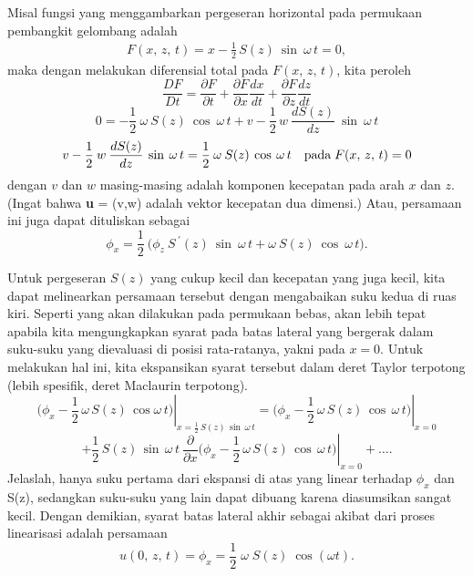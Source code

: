 \documentclass[12pt,a4paper]{report}
\begin{document}
Misal fungsi yang menggambarkan pergeseran horizontal pada permukaan
pembangkit gelombang adalah
\begin{eqnarray}
F(x,\,z,\,t) = x - \frac{1}{2}\,S(z)\:\sin \:\omega\, t = 0,
\end{eqnarray}
maka dengan melakukan diferensial total pada $F(x,\,z,\,t)$, kita peroleh
\begin{equation}
\frac{DF}{Dt} = \frac{\partial F}{\partial t} + \frac{\partial F}{\partial x}
\frac{dx}{dt} + \frac{\partial F}{\partial z} \frac{dz}{dt}
\end{equation}
\begin{equation}
0 = -\frac{1}{2}\:\omega\: S(z)\: \cos\: \omega\, t + v - \frac{1}{2}\,w\:
\frac{dS(z)}{dz}\: \sin\: \omega\, t
\end{equation}
\begin{equation}
v - \frac{1}{2}\:w\: \frac{dS(z)}{dz}\: \sin\: \omega\, t = \frac{1}{2}%
\:\omega\: S(z)\: \cos\: \omega\, t \quad \textmd{pada}
\;F(x,\,z,\,t)=0
\end{equation}
dengan $v$ dan $w$ masing-masing adalah komponen kecepatan pada arah $x$ dan
$z$. (Ingat bahwa \textbf{u} = (v,w) adalah vektor kecepatan dua dimensi.)
Atau, persamaan ini juga dapat dituliskan sebagai
\begin{equation}
\phi_{x}=\frac{1}{2}\:\Bigg(\phi_{z}\:S\,^{\prime}(z)\:\sin\: \omega\,
t+\omega\: S(z)\:\cos\: \omega\, t\Bigg).
\end{equation}

Untuk pergeseran $S(z)$ yang cukup kecil dan kecepatan yang juga
kecil, kita dapat melinearkan persamaan tersebut dengan
mengabaikan suku kedua di ruas kiri. Seperti yang akan dilakukan
pada permukaan bebas, akan lebih tepat apabila kita mengungkapkan
syarat pada batas lateral yang bergerak dalam suku-suku yang
dievaluasi di posisi rata-ratanya, yakni pada $x = 0.$ Untuk
melakukan hal ini, kita ekspansikan syarat tersebut dalam deret
Taylor terpotong (lebih spesifik, deret Maclaurin terpotong).
\[
\displaystyle\left.\Bigg(\phi_{x}-\frac{1}{2}\,\omega\,S(z)\,\cos \omega\,t%
\Bigg)\right|_{x=\frac{1}{2}\,S(z)\,\sin\,\omega\,t} =\left.\Bigg(\phi_{x}-%
\frac{1}{2}\,\omega\,S(z)\,\cos\,\omega\, t\Bigg)\right|_{x=0}
\]
\begin{equation}
\displaystyle +\frac{1}{2}\,S(z)\,\sin\,\omega\,t\: \frac{\partial}{\partial
x}\left.\Bigg(\phi_{x}-\frac{1}{2}\,\omega\,S(z)\,\cos\,\omega\, t\Bigg)%
\right|_{x=0} + \dots.
\end{equation}
Jelaslah, hanya suku pertama dari ekspansi di atas yang linear terhadap $%
\phi_{x}$ dan S(z), sedangkan suku-suku yang lain dapat dibuang karena
diasumsikan sangat kecil. Dengan demikian, syarat batas lateral akhir
sebagai akibat dari proses linearisasi adalah persamaan
\begin{equation}
u(0,\,z,\,t)=\phi_{x}=\frac{1}{2}\;\omega\; S(z)\;\cos(\omega t).
\end{equation}
\end{document}
